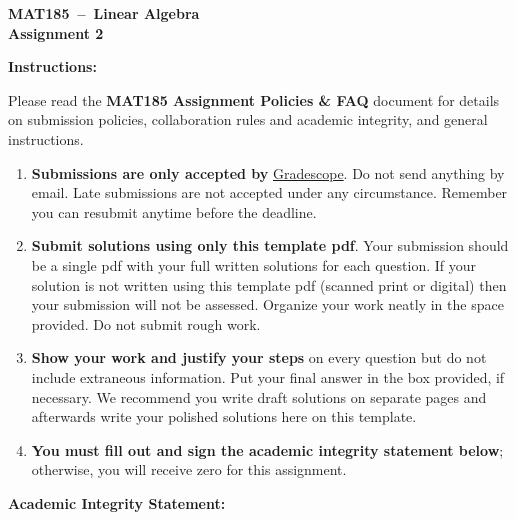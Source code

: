 \documentclass[10pt,addpoints]{exam} %
\newcommand{\course}{MAT185}
\newcommand{\assignmenttitle}{Assignment 2}
\begin{document}
\vspace*{-0.5cm}
\begin{center}
  \large
  \textbf{\Large \course~--~Linear Algebra}\\[0.1cm]
  \textbf{\assignmenttitle}
\end{center}
\bigskip

\textbf{\large Instructions:}\\
\normalsize

Please read the {\bf MAT185 Assignment Policies \& FAQ} document for
details on submission policies, collaboration rules and academic integrity, and
general instructions.

\begin{enumerate}


\item \textbf{Submissions are only accepted by}
  \href{https://www.gradescope.ca}{Gradescope}. Do not send anything by email.
  Late submissions are not accepted under any circumstance. Remember you can
  resubmit anytime before the deadline.

\item \textbf{Submit solutions using only this template pdf}.  Your submission
  should be a single pdf with your full written solutions for each question. If
  your solution is not written using this template pdf (scanned print or
  digital) then your submission will not be assessed. Organize your work neatly
  in the space provided.  Do not submit rough work.

\item \textbf{Show your work and justify your steps} on every question but do
  not include extraneous information.  Put your final answer in the box
  provided, if necessary.  We recommend you write draft solutions on separate
  pages and afterwards write your polished solutions here on this template.

\item \textbf{You must fill out and sign the academic integrity statement
    below}; otherwise, you will receive zero for this assignment.

\end{enumerate}

\vspace{10pt}


\textbf{\large Academic Integrity Statement:} \\


\end{document}
